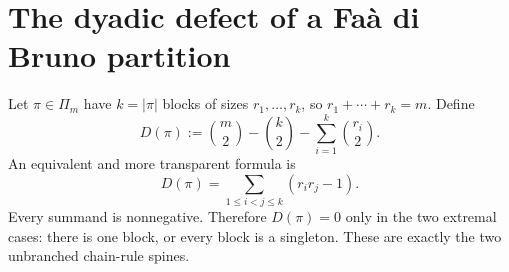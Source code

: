 \documentclass[11pt,oneside]{article}
\theoremstyle{definition}
\theoremstyle{remark}
\begin{document}
\section{The dyadic defect of a Fa\`a di Bruno partition}
\label{sec:defect}

Let $\pi\in\Pi_m$ have $k=|\pi|$ blocks of sizes
$r_1,\ldots,r_k$, so $r_1+\cdots+r_k=m$.  Define
\begin{equation}
 D(\pi):=\binom m2-\binom k2-\sum_{i=1}^k\binom{r_i}{2}.
 \label{eq:defect}
\end{equation}
An equivalent and more transparent formula is
\begin{equation}
 D(\pi)=\sum_{1\leq i<j\leq k}(r_ir_j-1).
 \label{eq:defect-pairs}
\end{equation}
Every summand is nonnegative.  Therefore $D(\pi)=0$ only in the two extremal cases:
there is one block, or every block is a singleton.  These are exactly the two
unbranched chain-rule spines.
\end{document}
